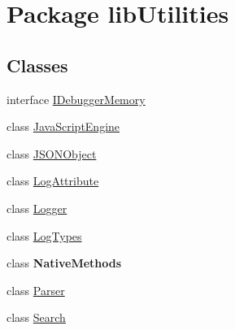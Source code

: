 \hypertarget{namespacelib_utilities}{\section{Package lib\+Utilities}
\label{namespacelib_utilities}
}
\subsection*{Classes}
\begin{DoxyCompactItemize}
\item 
interface \hyperlink{interfacelib_utilities_1_1_i_debugger_memory}{I\+Debugger\+Memory}
\item 
class \hyperlink{classlib_utilities_1_1_java_script_engine}{Java\+Script\+Engine}
\item 
class \hyperlink{classlib_utilities_1_1_j_s_o_n_object}{J\+S\+O\+N\+Object}
\item 
class \hyperlink{classlib_utilities_1_1_log_attribute}{Log\+Attribute}
\item 
class \hyperlink{classlib_utilities_1_1_logger}{Logger}
\item 
class \hyperlink{classlib_utilities_1_1_log_types}{Log\+Types}
\item 
class {\bfseries Native\+Methods}
\item 
class \hyperlink{classlib_utilities_1_1_parser}{Parser}
\item 
class \hyperlink{classlib_utilities_1_1_search}{Search}
\end{DoxyCompactItemize}
